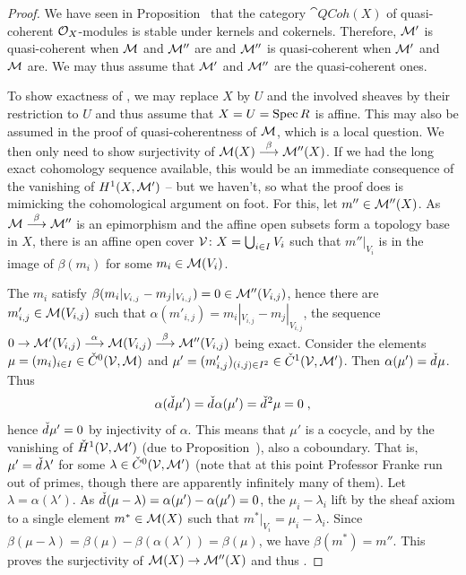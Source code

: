 \documentclass[a4paper,parskip=half,numbers=enddot, DIV=12]{scrreprt}
\begin{document}
\begin{proof}
	We have seen in Proposition~ that the category $\cat{QCoh}(X)$ of quasi-coherent $\mathcal{O}_X$-modules is stable under kernels and cokernels. Therefore, $\mathcal{M}'$ is quasi-coherent when $\mathcal{M}$ and $\mathcal{M}''$ are and $\mathcal{M}''$ is quasi-coherent when $\mathcal{M}'$ and $\mathcal{M}$ are. We may thus assume that $\mathcal{M}'$ and $\mathcal{M}''$ are the quasi-coherent ones.
	
	To show exactness of , we may replace $X$ by $U$ and the involved sheaves by their restriction to $U$ and thus assume that $X=U=\operatorname{Spec} R$ is affine. This may also be assumed in the proof of quasi-coherentness of $\mathcal{M}$, which is a local question. We then only need to show surjectivity of $\Mm(X)\morphism[\beta]\Mm''(X)$. If we had the long exact cohomology sequence available, this would be an immediate consequence of the vanishing of $H^1(X,\mathcal{M}')$ -- but we haven't, so what the proof does is mimicking the cohomological argument on foot. For this, let $m''\in\mathcal{M}''(X)$. As $\Mm\morphism[\beta]\Mm''$ is an epimorphism and the affine open subsets form a topology base in $X$, there is an affine open cover $\mathcal{V}\colon X=\bigcup_{i\in I}V_i$ such that $m''|_{V_i}$ is in the image of $\beta(m_i)$ for some $m_i\in \mathcal{M}(V_i)$.
	
	The $m_i$ satisfy $\beta(m_i|_{V_{i,j}}-m_j|_{V_{i,j}})=0\in\mathcal{M}''(V_{i,j})$, hence there are $m'_{i,j}\in\mathcal{M}(V_{i,j})$ such that $\alpha(m'_{i,j})=m_i|_{V_{i,j}}-m_j|_{V_{i,j}}$, the sequence $0\morphism\Mm'(V_{i,j})\morphism[\alpha]\Mm(V_{i,j})\morphism[\beta]\Mm''(V_{i,j})$ being exact. Consider the elements $\mu=(m_i)_{i\in I}\in \check{C}^0(\mathcal{V},\mathcal{M})$ and $\mu'=(m'_{i,j})_{(i,j)\in I^2}\in \check{C}^1(\mathcal{V},\mathcal{M}')$. Then $\alpha(\mu')=\check{d}\hspace{0.06125em}\mu$. Thus 
	\begin{align*}
		\alpha(\check{d}\hspace{0.06125em}\mu')=\check{d}\hspace{0.06125em}\alpha(\mu')=\check{d}\hspace{0.06125em}^2\mu=0\;,
	\end{align*}
	hence $\check{d}\hspace{0.06125em}\mu'=0$ by injectivity of $\alpha$. This means that $\mu'$ is a cocycle, and by the vanishing of $\check{H}^1(\mathcal{V},\mathcal{M}')$ (due to Proposition~), also a coboundary. That is, $\mu'=\check{d}\hspace{0.06125em}\lambda'$ for some $\lambda\in\check{C}^0(\mathcal{V},\mathcal{M}')$ (note that at this point Professor Franke run out of primes, though there are apparently infinitely many of them). Let $\lambda=\alpha(\lambda')$. As $\check{d}\hspace{0.06125em}(\mu-\lambda)=\alpha(\mu')-\alpha(\mu')=0$, the $\mu_i-\lambda_i$ lift by the sheaf axiom to a single element $m^*\in\mathcal{M}(X)$ such that $m^*|_{V_i}=\mu_i-\lambda_i$. Since $\beta(\mu-\lambda)=\beta(\mu)-\beta(\alpha(\lambda'))=\beta(\mu)$, we have $\beta(m^*)=m''$. This proves the surjectivity of $\Mm(X)\morphism\Mm''(X)$ and thus .
	

\end{proof}
\end{document}
